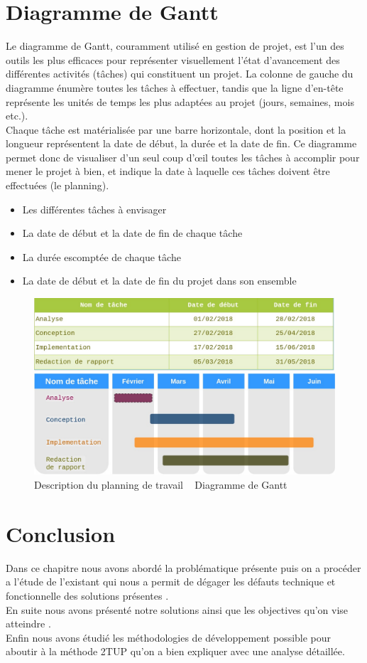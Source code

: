 \documentclass[11pt,a4paper,oneside]{book}
\begin{document}
\section{Diagramme de Gantt}
Le diagramme de Gantt, couramment utilisé en gestion de projet, est l'un des outils les plus efficaces pour représenter visuellement l'état d'avancement des différentes activités (tâches) qui constituent un projet. La colonne de gauche du diagramme énumère toutes les tâches à effectuer, tandis que la ligne d'en-tête représente les unités de temps les plus adaptées au projet (jours, semaines, mois etc.).\\
 Chaque tâche est matérialisée par une barre horizontale, dont la position et la longueur représentent la date de début, la durée et la date de fin. Ce diagramme permet donc de visualiser d'un seul coup d'œil toutes les tâches à accomplir pour mener le projet à bien, et indique la date à laquelle ces tâches doivent être effectuées (le planning).\\

\begin{itemize}
	\item Les différentes tâches à envisager
	\item La date de début et la date de fin de chaque tâche
	\item La durée escomptée de chaque tâche
	\item  La date de début et la date de fin du projet dans son ensemble
\end{itemize}
\begin{figure}[H]
	\centering
	\includegraphics[width=0.7\linewidth]{"Images/diagram de gantt"}
	\caption{Description du planning de travail ~ Diagramme de Gantt}
	\label{fig:diagram-de-gantt}
\end{figure}

	\section{Conclusion}
	Dans ce chapitre nous avons abordé la problématique présente puis on a procéder a l'étude de l'existant qui nous a permit de dégager les défauts technique et fonctionnelle des solutions présentes .\\
	En suite nous avons présenté notre solutions ainsi que les objectives qu'on vise atteindre .\\
	Enfin nous avons étudié les méthodologies de développement possible pour aboutir à la méthode 2TUP qu’on a bien expliquer avec une analyse détaillée.
	
\end{document}
